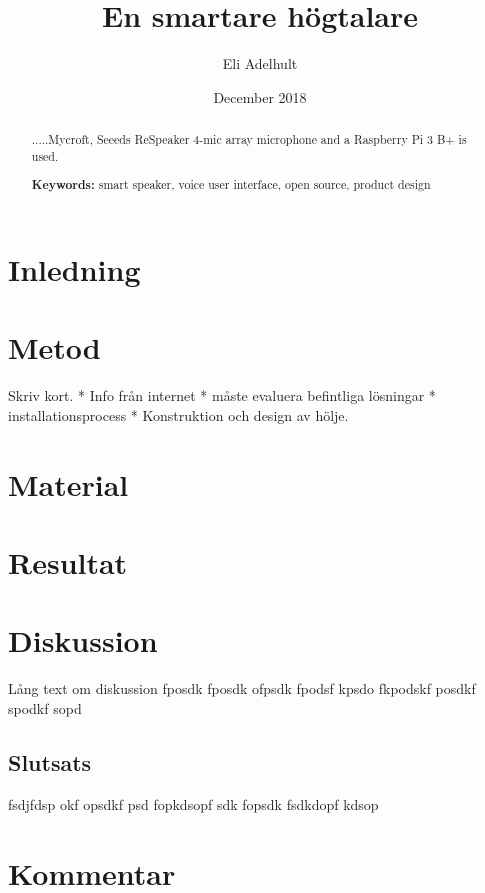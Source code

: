 \documentclass[12pt,a4paper, titlepage]{article}
\title{En smartare högtalare}
\author{Eli Adelhult}
\date{December 2018}
\begin{document}
\maketitle
\thispagestyle{empty}
\begin{abstract}
\noindent .....Mycroft, Seeeds ReSpeaker 4-mic array microphone and a Raspberry Pi 3 B+ is used.
\begin{flushleft}
		{\small {\bf Keywords:} smart speaker, voice user interface, open source, product design}
\end{flushleft}
\end{abstract}

\thispagestyle{empty}
\newpage
\tableofcontents
\thispagestyle{empty}
\newpage
\section{Inledning}

\section{Metod}
Skriv kort. 
* Info från internet
* måste evaluera befintliga lösningar
* installationsprocess
* Konstruktion och design av hölje.
\section{Material}


\section{Resultat}


\section{Diskussion}
Lång text om diskussion fposdk fposdk ofpsdk fpodsf kpsdo fkpodskf posdkf spodkf sopd
\subsection{Slutsats}
fsdjfdsp okf opsdkf psd fopkdsopf sdk fopsdk fsdkdopf kdsop
\section{Kommentar}

\newpage
{} 
\printbibliography
\end{document}
